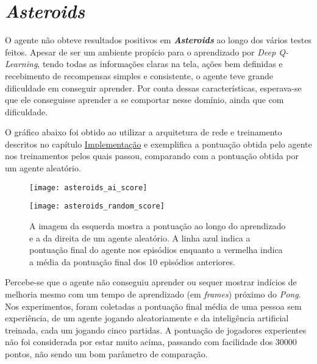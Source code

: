 
\section{\textit{Asteroids}}
\label{sec:res_asteroids}
O agente não obteve resultados positivos em \textbf{\textit{Asteroids}} ao longo dos vários testes feitos.
Apesar de ser um ambiente propício para o aprendizado por \textit{Deep Q-Learning}, tendo todas as informações claras na tela, ações bem definidas e recebimento de recompensas simples e consistente, o agente teve grande dificuldade em conseguir aprender.
Por conta dessas características, esperava-se que ele conseguisse aprender a se comportar nesse domínio, ainda que com dificuldade.

O gráfico abaixo foi obtido ao utilizar a arquitetura de rede e treinamento descritos no capítulo \hyperref[cap:implementacao]{Implementação} e exemplifica a pontuação obtida pelo agente nos treinamentos pelos quais passou, comparando com a pontuação obtida por um agente aleatório.

\begin{figure}[h!]
  \begin{minipage}[b]{.5\textwidth}
  \centering
  \texttt{[image: asteroids\_ai\_score]}
  \end{minipage}
  \hfill
  \begin{minipage}[b]{.5\textwidth}
  \centering
  \texttt{[image: asteroids\_random\_score]}
  \end{minipage}
  \caption{A imagem da esquerda mostra a pontuação ao longo do aprendizado e a da direita de um agente aleatório. A linha azul indica a pontuação final do agente nos episódios enquanto a vermelha indica a média da pontuação final dos 10 episódios anteriores.}
  \label{fig:asteroids_score}
\end{figure}

Percebe-se que o agente não conseguiu aprender ou sequer mostrar indícios de melhoria mesmo com um tempo de aprendizado (em \textit{frames}) próximo do \textit{Pong}.
Nos experimentos, foram coletadas a pontuação final média de uma pessoa sem experiência, de um agente jogando aleatoriamente e da inteligência artificial treinada, cada um jogando cinco partidas.
A pontuação de jogadores experientes não foi considerada por estar muito acima, passando com facilidade dos 30000 pontos, não sendo um bom parâmetro de comparação.

